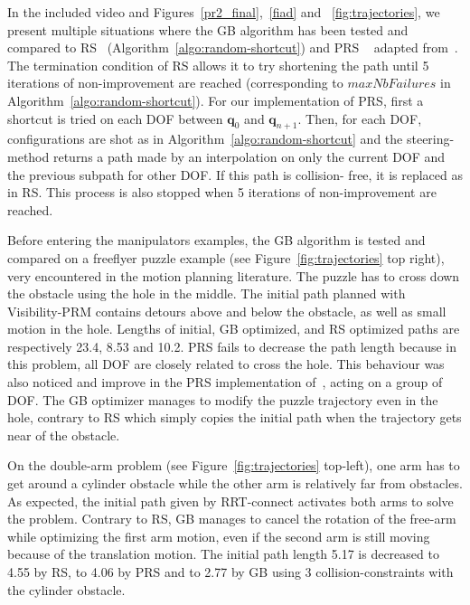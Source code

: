 \documentclass{tADR2e}
\newcommand\conf{\mathbf{q}}
\begin{document}
In the included video and Figures~\ref{pr2_final},~\ref{fiad} and
 ~\ref{fig:trajectories}, we present multiple situations where the GB algorithm has 
been tested and compared to RS~\cite{randomShortcutHPP}
(Algorithm~\ref{algo:random-shortcut}) and PRS ~\cite{partialrandomShortcutHPP} 
adapted from~\cite{Geraerts04clearancebased}.
The termination condition of RS allows it to try 
shortening the path until 5 iterations of non-improvement are reached 
(corresponding to $maxNbFailures$ in Algorithm~\ref{algo:random-shortcut}).
For our implementation of PRS, first a shortcut is tried on each DOF between 
$\conf_0$ and $\conf_{n+1}$. 
Then, for each DOF, configurations are shot as in 
Algorithm~\ref{algo:random-shortcut} and the steering-method returns a path made by 
an interpolation on only 
the current DOF and the previous subpath for other DOF. If this path is collision-
free, it is replaced as in RS. This process is also stopped when 5 iterations of 
non-improvement are reached.

\vspace{0.4cm}
Before entering the manipulators examples, the GB algorithm is tested and compared 
on a freeflyer puzzle example (see Figure~\ref{fig:trajectories} top right), very 
encountered in the motion planning literature. The puzzle has to cross down the 
obstacle using the hole in the middle. The initial path planned with Visibility-PRM 
contains detours above and below the obstacle, as well as small motion in the hole. 
Lengths of initial, GB optimized, and RS optimized paths are 
respectively 23.4, 8.53 and 10.2. PRS fails to decrease the path length because in this problem, all DOF are closely related to cross the hole. This behaviour was also noticed and improve in the PRS implementation of~\cite{Geraerts04clearancebased}, acting on a group of DOF. The GB optimizer manages to modify the puzzle trajectory even in the hole, contrary to RS which simply copies the initial path when the trajectory gets near of the obstacle.

\vspace{0.4cm}

On the double-arm problem (see Figure~\ref{fig:trajectories} top-left), one arm has 
to get around a cylinder obstacle while the 
other arm is relatively far from obstacles. As expected, the initial path given by 
RRT-connect activates both arms to solve the problem. Contrary to RS, 
GB manages to cancel the rotation of the free-arm while optimizing the 
first arm motion, even if the second arm is still moving because of the translation 
motion. The initial path length 5.17 is decreased to 4.55 by RS, to 4.06 by PRS and 
to 2.77 by GB using 3 collision-constraints with the cylinder obstacle.
\end{document}
